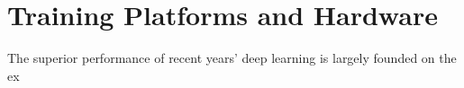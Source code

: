 \section{Training Platforms and Hardware}
The superior performance of recent years' deep learning is largely founded on the ex